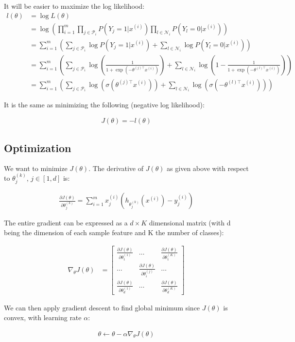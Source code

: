 It will be easier to maximize the log likelihood:
\begin{align}
	l(\theta) &= \log L(\theta) \\
			  &= \log \left( \prod_{i=1}^m  \prod_{j \in \mathcal{P}_i } P(Y_j=1 | x^{(i)}) \prod_{l \in \mathcal{N}_i} P(Y_l=0 | x^{(i)}) \right) \\
			  &= \sum_{i=1}^m \left( \sum_{j \in \mathcal{P}_i } \log P(Y_j=1 | x^{(i)}) + \sum_{l \in \mathcal{N}_i} \log P(Y_l=0 | x^{(i)})  \right) \\
			  &= \sum_{i=1}^m \left( \sum_{j \in \mathcal{P}_i } \log (\frac{1}{1 + \exp(-\theta^{(j)\top} x^{(i)})}) + \sum_{l \in \mathcal{N}_i} \log (1 - \frac{1}{1 + \exp(-\theta^{(l)\top} x^{(i)})}) \right) \\
			  &= \sum_{i=1}^m \left( \sum_{j \in \mathcal{P}_i } \log (\sigma(\theta^{(j)\top} x^{(i)})) + \sum_{l \in \mathcal{N}_i} \log (\sigma(-\theta^{(l)\top} x^{(i)})) \right)
\end{align}


It is the same as minimizing the following (negative log likelihood):

\begin{align} 
	J(\theta) = -l(\theta)
\end{align}

\subsection*{Optimization}

We want to minimize $J(\theta)$. The derivative of $J(\theta)$ as given above with respect to $\theta_j^{(k)}$, $j \in [1,d]$ is:

\begin{align}
	\frac{\partial J(\theta)}{\partial \theta_j^{(k)}} = \sum_{i=1}^m x^{(i)}_j (h_{\theta_j^{(k)}}(x^{(i)}) - y_j^{(i)})
\end{align}

The entire gradient can be expressed as a $d \times K$ dimensional matrix (with d being the dimension of each sample feature and K the number of classes):

\begin{align}
	\nabla_\theta J(\theta) 
	&= 
	\begin{bmatrix}
		\frac{\partial J(\theta)}{\partial \theta_1^{(1)}} 	& \dots 						& \frac{\partial J(\theta)}{\partial \theta_1^{(K)}} \\
		\dots 												&  \frac{\partial J(\theta)}{\partial \theta_i^{(j)}} 	& \dots \\
		\frac{\partial J(\theta)}{\partial \theta_d^{(1)}} 	& \dots 						& \frac{\partial J(\theta)}{\partial \theta_d^{(K)}}
	\end{bmatrix} 
\end{align}

We can then apply gradient descent to find global minimum since $J(\theta)$ is convex, with learning rate $\alpha$:

\begin{align}
	\theta \leftarrow \theta - \alpha \nabla_\theta J(\theta)
\end{align}



